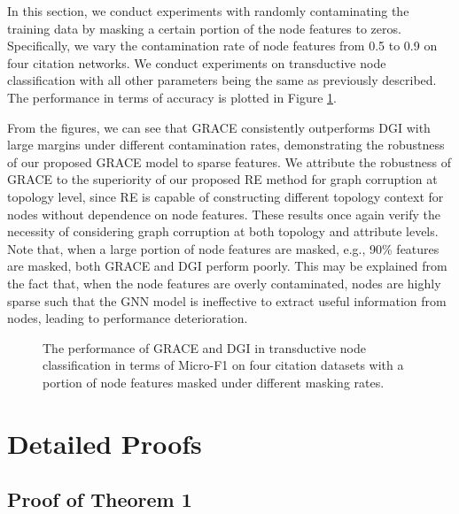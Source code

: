 \documentclass{article}
\theoremstyle{remark}
\begin{document}
In this section, we conduct experiments with randomly contaminating the training data by masking a certain portion of the node features to zeros. Specifically, we vary the contamination rate of node features from 0.5 to 0.9 on four citation networks. We conduct experiments on transductive node classification with all other parameters being the same as previously described. The performance in terms of accuracy is plotted in Figure \ref{fig:robustness}.

From the figures, we can see that GRACE consistently outperforms DGI with large margins under different contamination rates, demonstrating the robustness of our proposed GRACE model to sparse features.
We attribute the robustness of GRACE to the superiority of our proposed RE method for graph corruption at topology level, since RE is capable of constructing different topology context for nodes without dependence on node features.
These results once again verify the necessity of considering graph corruption at both topology and attribute levels.
Note that, when a large portion of node features are masked, e.g., 90\% features are masked, both GRACE and DGI perform poorly. This may be explained from the fact that, when the node features are overly contaminated, nodes are highly sparse such that the GNN model is ineffective to extract useful information from nodes, leading to performance deterioration. 

\begin{figure}[h]
	\centering
	\caption{The performance of GRACE and DGI in transductive node classification in terms of Micro-F1 on four citation datasets with a portion of node features masked under different masking rates.}
	\label{fig:robustness}
\end{figure}

\section{Detailed Proofs}
\label{appendix:proofs}

\subsection{Proof of Theorem 1}
\end{document}
